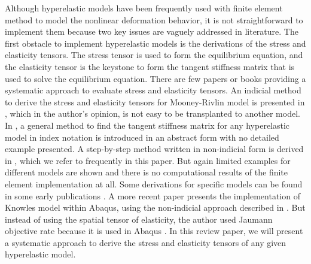 Although hyperelastic models have been frequently used with finite element method to model the nonlinear deformation behavior, it is not straightforward to implement them because two key issues are vaguely addressed in literature. The first obstacle to implement hyperelastic models is the derivations of the stress and elasticity tensors. The stress tensor is used to form the equilibrium equation, and the elasticity tensor is the keystone to form the tangent stiffness matrix that is used to solve the equilibrium equation. There are few papers or books providing a systematic approach to evaluate stress and elasticity tensors. An indicial method to derive the stress and elasticity tensors for Mooney-Rivlin model is presented in \cite{Bower}, which in the author's opinion, is not easy to be transplanted to another model. In \cite{Belytschko}, a general method to find the tangent stiffness matrix for any hyperelastic model in index notation is introduced in an abstract form with no detailed example presented. A step-by-step method written in non-indicial form is derived in \cite{Holzapfel}, which we refer to frequently in this paper. But again limited examples for different models are shown and there is no computational results of the finite element implementation at all. Some derivations for specific models can be found in some early publications \cite{Weiss, Nicholson}. A more recent paper \cite{Suchocki} presents the implementation of Knowles model within Abaqus, using the non-indicial approach described in \cite{Holzapfel}. But instead of using the spatial tensor of elasticity, the author used Jaumann objective rate because it is used in Abaqus \cite{Abaqus}. In this review paper, we will present a systematic approach to derive the stress and elasticity tensors of any given hyperelastic model.



